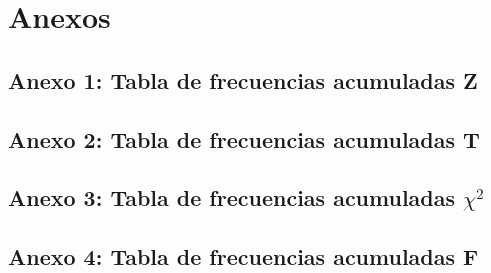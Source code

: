 \section{Anexos}

\subsection{Anexo 1: Tabla de frecuencias acumuladas Z}

\subsection{Anexo 2: Tabla de frecuencias acumuladas T}

\subsection{Anexo 3: Tabla de frecuencias acumuladas \texorpdfstring{$\chi^2$}{chi}}

\subsection{Anexo 4: Tabla de frecuencias acumuladas F}